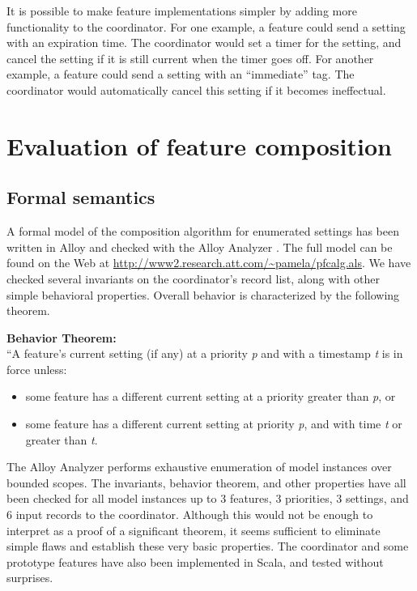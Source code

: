 \documentclass[conference]{IEEEtran}
\begin{document}
\vspace{2mm}
It is possible to make feature implementations simpler by adding more
functionality to the coordinator.
For one example, a feature could send a setting with an expiration
time.
The coordinator would set a timer for the setting, and cancel the
setting if it is still current when the timer goes off.
For another example, a feature could send a setting with an
``immediate'' tag.
The coordinator would automatically cancel this setting if it becomes
ineffectual.

\section{Evaluation of feature composition}
\label{sec:evidence}

\subsection{Formal semantics}
\label{sec:properties}

A formal model of the composition algorithm for enumerated settings
has been written in Alloy and checked with the Alloy Analyzer
\cite{alloy-book}.
The full model can be found on the Web at
\url{http://www2.research.att.com/~pamela/pfcalg.als}.
We have checked several invariants on the coordinator's record
list, along with other simple behavioral properties.
Overall behavior is characterized by the following theorem.

\vspace{2mm}
{\bf Behavior Theorem:} \\
``A feature's current setting (if any)
at a priority {\it p} and with a timestamp {\it t}
is in force unless:
\begin{itemize}
\item
some feature has a different current setting at a priority greater than
{\it p}, or
\item
some feature has a different current setting at priority {\it p}, and with
time {\it t} or greater than {\it t}.
\end{itemize}

\vspace{2mm}
The Alloy Analyzer performs
exhaustive enumeration of model instances over bounded scopes.
The invariants, behavior theorem, and other properties
have all been checked for all model instances up to 3 features,
3 priorities, 3 settings, and 6 input records to the coordinator.
Although this would not be enough to interpret as a proof of a
significant theorem, it seems sufficient to eliminate simple
flaws and establish these very basic properties.
The coordinator and some prototype features have also been implemented
in Scala, and tested without surprises.
\end{document}
